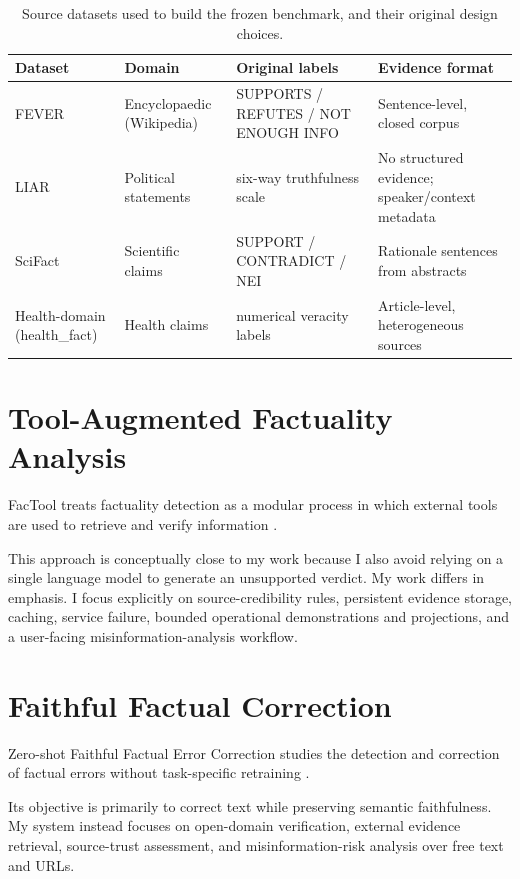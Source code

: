 \documentclass[12pt,a4paper,openany]{report}
\begin{document}
\begin{table}[H]
\centering
\caption{Source datasets used to build the frozen benchmark, and their original design choices.}
\label{tab:dataset-lit}
\small
\begin{tabularx}{\textwidth}{p{1.6cm}p{2.6cm}p{3.4cm}X}
\toprule
Dataset & Domain & Original labels & Evidence format \\
\midrule
FEVER & Encyclopaedic (Wikipedia) & SUPPORTS / REFUTES / NOT ENOUGH INFO & Sentence-level, closed corpus \\
LIAR & Political statements & six-way truthfulness scale & No structured evidence; speaker/context metadata \\
SciFact & Scientific claims & SUPPORT / CONTRADICT / NEI & Rationale sentences from abstracts \\
Health-domain (health\_fact) & Health claims & numerical veracity labels & Article-level, heterogeneous sources \\
\bottomrule
\end{tabularx}
\end{table}

\section{Tool-Augmented Factuality Analysis}
FacTool treats factuality detection as a modular process in which external tools are used to retrieve and verify information \citep{chern2023factool}.

This approach is conceptually close to my work because I also avoid relying on a single language model to generate an unsupported verdict. My work differs in emphasis. I focus explicitly on source-credibility rules, persistent evidence storage, caching, service failure, bounded operational demonstrations and projections, and a user-facing misinformation-analysis workflow.

\section{Faithful Factual Correction}
Zero-shot Faithful Factual Error Correction studies the detection and correction of factual errors without task-specific retraining \citep{huang2023zeroshot}.

Its objective is primarily to correct text while preserving semantic faithfulness. My system instead focuses on open-domain verification, external evidence retrieval, source-trust assessment, and misinformation-risk analysis over free text and URLs.
\end{document}
